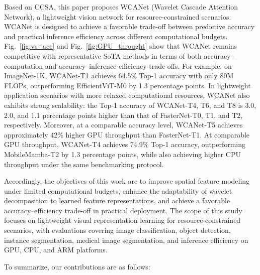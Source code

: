 \documentclass[a4paper,fleqn]{cas-dc}
\begin{document}
Based on CCSA, this paper proposes WCANet (Wavelet Cascade Attention Network), a lightweight vision network for resource-constrained scenarios. 
{\color{blue}
WCANet is designed to achieve a favorable trade-off between predictive accuracy and practical inference efficiency across different computational budgets.
}
{\color{blue}
Fig.~\ref{fig:vs_acc} and Fig.~\ref{fig:GPU_throught} show that WCANet remains competitive with representative SoTA methods in terms of both accuracy--computation and accuracy--inference efficiency trade-offs.
}
{\color{blue}
For example, on ImageNet-1K, WCANet-T1 achieves 64.5\% Top-1 accuracy with only 80M FLOPs, outperforming EfficientViT-M0 by 1.3 percentage points.
}
{ \color{green} 
In lightweight application scenarios with more relaxed computational resources, WCANet also exhibits strong scalability: the Top-1 accuracy of WCANet-T4, T6, and T8 is 3.0, 2.0, and 1.1 percentage points higher than that of FasterNet-T0, T1, and T2, respectively. Moreover, at a comparable accuracy level, WCANet-T5 achieves approximately 42\% higher GPU throughput than FasterNet-T1.
}
{\color{blue}
At comparable GPU throughput, WCANet-T4 achieves 74.9\% Top-1 accuracy, outperforming MobileMamba-T2 by 1.3 percentage points, while also achieving higher CPU throughput under the same benchmarking protocol.
}


{\color{blue}
Accordingly, the objectives of this work are to improve spatial feature modeling under limited computational budgets, enhance the adaptability of wavelet decomposition to learned feature representations, and achieve a favorable accuracy--efficiency trade-off in practical deployment.
The scope of this study focuses on lightweight visual representation learning for resource-constrained scenarios, with evaluations covering image classification, object detection, instance segmentation, medical image segmentation, and inference efficiency on GPU, CPU, and ARM platforms.
}



To summarize, our contributions are as follows:
\end{document}
